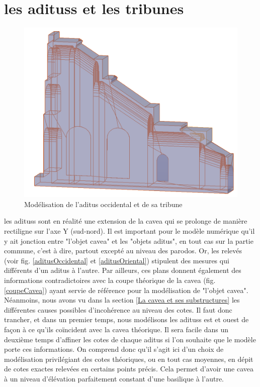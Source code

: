 		
\section{les \glspl{aditus} et les tribunes} 

\begin{figure}[!h]
	\includegraphics[width=\linewidth]{images/modAditus}
	\caption{Modélisation de l'\gls{aditus} occidental et de sa tribune} 
	\label{modAditus} 
\end{figure}  
		
les \glspl{aditus} sont en réalité une extension de la \gls{cavea} qui se prolonge de manière rectiligne sur l'axe Y (sud-nord). Il est important pour le modèle numérique qu'il y ait jonction entre "l'objet cavea" et les "objets aditus", en tout cas sur la partie commune, c'est à dire, partout excepté au niveau des \gls{parodos}. Or, les relevés (voir fig. \ref{aditusOccidental} et \ref{aditusOriental}) stipulent des mesures qui différents d'un \gls{aditus} à l'autre. Par ailleurs, ces plans donnent également des informations contradictoires avec la coupe théorique de la \gls{cavea} (fig. \ref{coupeCavea}) ayant servie de référence pour la modélisation de "l'objet cavea". Néanmoins, nous avons vu dans la section \ref{La cavea et ses substructures} les différentes causes possibles d'incohérence au niveau des cotes. Il faut donc trancher, et dans un premier temps, nous modélisons les \glspl{aditus} est et ouest de façon à ce qu'ils coïncident avec la \gls{cavea} théorique. Il sera facile dans un deuxième temps d'affiner les cotes de chaque  \gls{aditus} si l'on souhaite que le modèle porte ces informations. On comprend donc qu'il s'agit ici d'un choix de modélisation privilégiant des cotes théoriques, ou en tout cas moyennes, en dépit de cotes exactes relevées en certains points précis. Cela permet d'avoir une \gls{cavea} à un niveau d'élévation parfaitement constant d'une \gls{basilique} à l'autre. 


